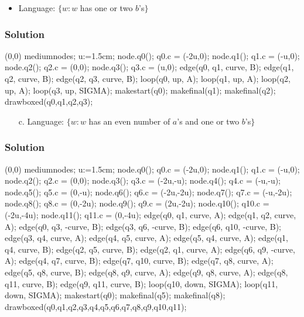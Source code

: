 \documentclass{article}
\begin{document}
\begin{empfile}
\begin{itemize}
\item Language: $\{w:w$ has one or two $b$'s$\}$
\end{itemize}

\subsubsection*{Solution}
	\begin{center}
	\begin{emp}(0,0)
	mediumnodes;
	u:=1.5cm;
	node.q0(); q0.c = (-2u,0);
	node.q1(); q1.c = (-u,0);
	node.q2(); q2.c = (0,0);
	node.q3(); q3.c = (u,0);
	edge(q0, q1, curve, B);
	edge(q1, q2, curve, B);
	edge(q2, q3, curve, B);
	loop(q0, up, A);
	loop(q1, up, A);
	loop(q2, up, A);
	loop(q3, up, SIGMA);
	makestart(q0);
	makefinal(q1);
	makefinal(q2);
	drawboxed(q0,q1,q2,q3);
	\end{emp}
	\end{center}
	
\begin{itemize}
\item[c.] Language: $\{w:w$ has an even number of $a$'s and one or
two $b$'s$\}$
\end{itemize}

\subsubsection*{Solution}
	\begin{center}
	\begin{emp}(0,0)
	mediumnodes;
	u:=1.5cm;
	node.q0(); q0.c = (-2u,0);
	node.q1(); q1.c = (-u,0);
	node.q2(); q2.c = (0,0);
	node.q3(); q3.c = (-2u,-u);
	node.q4(); q4.c = (-u,-u);
	node.q5(); q5.c = (0,-u);
	node.q6(); q6.c = (-2u,-2u);
	node.q7(); q7.c = (-u,-2u);
	node.q8(); q8.c = (0,-2u);
	node.q9(); q9.c = (2u,-2u);
	node.q10(); q10.c = (-2u,-4u);
	node.q11(); q11.c = (0,-4u);
	edge(q0, q1, curve, A);
	edge(q1, q2, curve, A);
	edge(q0, q3, -curve, B);
	edge(q3, q6, -curve, B);
	edge(q6, q10, -curve, B);
	edge(q3, q4, curve, A);
	edge(q4, q5, curve, A);
	edge(q5, q4, curve, A);
	edge(q1, q4, curve, B);	
	edge(q2, q5, curve, B);
	edge(q2, q1, curve, A);
	edge(q6, q9, -curve, A);
	edge(q4, q7, curve, B);
	edge(q7, q10, curve, B);
	edge(q7, q8, curve, A);
	edge(q5, q8, curve, B);
	edge(q8, q9, curve, A);
	edge(q9, q8, curve, A);
	edge(q8, q11, curve, B);
	edge(q9, q11, curve, B);
	loop(q10, down, SIGMA);
	loop(q11, down, SIGMA);
	makestart(q0);
	makefinal(q5);
	makefinal(q8);
	drawboxed(q0,q1,q2,q3,q4,q5,q6,q7,q8,q9,q10,q11);
	\end{emp}
	\end{center}


\end{empfile}
\end{document}
